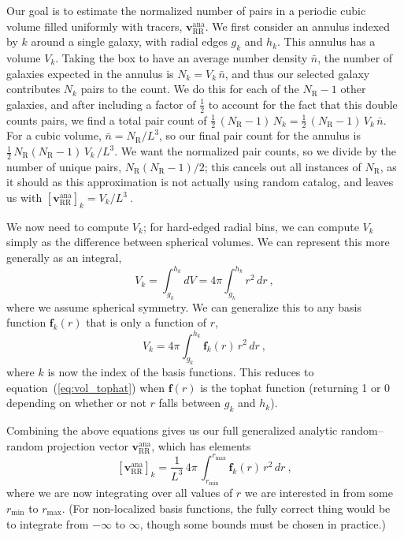 \documentclass[modern]{aastex62}
\newcommand{\eqt}[1]{equation~(\ref{#1})}
\newcommand{\bld}[1]{\bm{#1}}
\newcommand{\vv}[1]{\bld{v}_\mathrm{#1}}
\newcommand{\ff}{\bld{f}}
\newcommand{\NN}[1]{N_\mathrm{#1}}
\begin{document}
Our goal is to estimate the normalized number of pairs in a periodic cubic volume filled uniformly with tracers, $\vv{RR}^\mathrm{ana}$. 
We first consider an annulus indexed by $k$ around a single galaxy, with radial edges $g_k$ and $h_k$. 
This annulus has a volume $V_k$.
Taking the box to have an average number density $\bar{n}$, the number of galaxies expected in the annulus is $N_k = V_k \, \bar{n}$, and thus our selected galaxy contributes $N_k$ pairs to the count.   
We do this for each of the $\NN{R}-1$ other galaxies, and after including a factor of $\frac{1}{2}$ to account for the fact that this double counts pairs, we find a total pair count of $\frac{1}{2} \, (\NN{R}-1) \, N_k = \frac{1}{2} \, (\NN{R}-1) \, V_k \, \bar{n}$.
For a cubic volume, $\bar{n} = \NN{R}/L^3$, so our final pair count for the annulus is  $\frac{1}{2} \, \NN{R}(\NN{R}-1) \, V_k \, / L^3$.
We want the normalized pair counts, so we divide by the number of unique pairs, $\NN{R}(\NN{R}-1)/2$; this cancels out all instances of $\NN{R}$, as it should as this approximation is not actually using random catalog, and leaves us with $\left[ \vv{RR}^\mathrm{ana} \right]_k = V_k / L^3 ~.$

We now need to compute $V_k$; for hard-edged radial bins, we can compute $V_k$ simply as the difference between spherical volumes. 
We can represent this more generally as an integral,
\begin{equation} \label{eq:vol_tophat}
V_k = \int_{g_k}^{h_k} dV = 4\pi \int_{g_k}^{h_k} r^2 \, dr ~,
\end{equation}
where we assume spherical symmetry.
We can generalize this to any basis function $\ff_k(r)$ that is only a function of $r$,
\begin{equation}
V_k = 4\pi  \int_{g_k}^{h_k} \ff_k(r) \, r^2 \, dr ~,
\end{equation}
where $k$ is now the index of the basis functions.
This reduces to \eqt{eq:vol_tophat} when $\ff(r)$ is the tophat function (returning 1 or 0 depending on whether or not $r$ falls between $g_k$ and $h_k$).

Combining the above equations gives us our full generalized analytic random--random projection vector $\vv{RR}^\mathrm{ana}$, which has elements
\begin{equation}
\left[ \vv{RR}^\mathrm{ana} \right]_k = \frac{1}{L^3} \, 4\pi \, \int_{r_\mathrm{min}}^{r_\mathrm{max}} \ff_k(r) \, r^2 \, dr ~,
\end{equation}
where we are now integrating over all values of $r$ we are interested in from some $r_\mathrm{min}$ to $r_\mathrm{max}$.
(For non-localized basis functions, the fully correct thing would be to integrate from $-\infty$ to $\infty$, though some bounds must be chosen in practice.)
\end{document}
